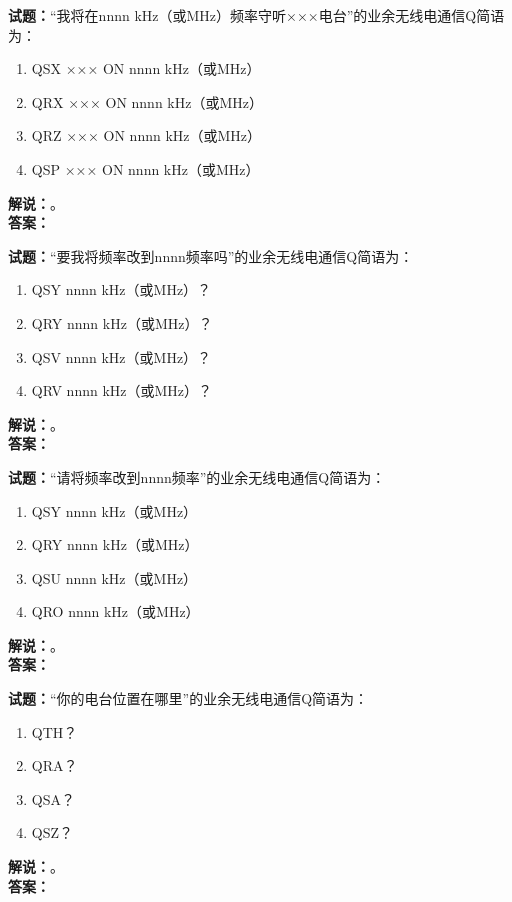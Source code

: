 \documentclass{ctexbook}
\begin{document}
\bigskip




\noindent\textbf{试题：}“我将在nnnn \si{\kHz}（或\unit{\MHz}）频率守听×××电台”的业余无线电通信Q简语为：
\begin{enumerate}[leftmargin=3em]
\item QSX ××× ON nnnn \si{\kHz}（或\unit{\MHz}）
\item QRX ××× ON nnnn \si{\kHz}（或\unit{\MHz}）
\item QRZ ××× ON nnnn \si{\kHz}（或\unit{\MHz}）
\item QSP ××× ON nnnn \si{\kHz}（或\unit{\MHz}）
\end{enumerate}
\noindent\textbf{解说：}\textbf{}。\\\noindent\textbf{答案：}

\bigskip




\noindent\textbf{试题：}“要我将频率改到nnnn频率吗”的业余无线电通信Q简语为：
\begin{enumerate}[leftmargin=3em]
\item QSY nnnn \si{\kHz}（或\unit{\MHz}）？
\item QRY nnnn \si{\kHz}（或\unit{\MHz}）？
\item QSV nnnn \si{\kHz}（或\unit{\MHz}）？
\item QRV nnnn \si{\kHz}（或\unit{\MHz}）？
\end{enumerate}
\noindent\textbf{解说：}\textbf{}。\\\noindent\textbf{答案：}

\bigskip




\noindent\textbf{试题：}“请将频率改到nnnn频率”的业余无线电通信Q简语为：
\begin{enumerate}[leftmargin=3em]
\item QSY nnnn \si{\kHz}（或\unit{\MHz}）
\item QRY nnnn \si{\kHz}（或\unit{\MHz}）
\item QSU nnnn \si{\kHz}（或\unit{\MHz}）
\item QRO nnnn \si{\kHz}（或\unit{\MHz}）
\end{enumerate}
\noindent\textbf{解说：}\textbf{}。\\\noindent\textbf{答案：}

\bigskip




\noindent\textbf{试题：}“你的电台位置在哪里”的业余无线电通信Q简语为：
\begin{enumerate}[leftmargin=3em]
\item QTH？
\item QRA？
\item QSA？
\item QSZ？
\end{enumerate}
\noindent\textbf{解说：}\textbf{}。\\\noindent\textbf{答案：}
\end{document}
